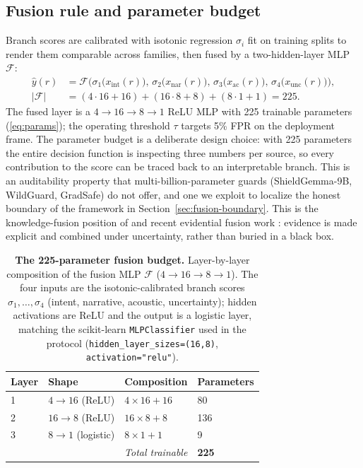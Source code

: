 \subsection{Fusion rule and parameter budget}
Branch scores are calibrated with isotonic regression $\sigma_i$ fit on
training splits to render them comparable across families, then fused by a
two-hidden-layer MLP $\mathcal{F}$:
\begin{align}
  \hat{y}(r) &=
    \mathcal{F}\!\Big(\sigma_1\big(x_{\mathrm{int}}(r)\big),\,
    \sigma_2\big(x_{\mathrm{nar}}(r)\big),\,
    \sigma_3\big(x_{\mathrm{ac}}(r)\big),\,
    \sigma_4\big(x_{\mathrm{unc}}(r)\big)\Big), \label{eq:fusion}\\
  |\mathcal{F}| &= (4\cdot 16 + 16) + (16\cdot 8 + 8) + (8\cdot 1 + 1) = 225. \label{eq:params}
\end{align}
The fused layer is a $4 \rightarrow 16 \rightarrow 8 \rightarrow 1$ ReLU MLP
with 225 trainable parameters (\eqref{eq:params}); the operating threshold
$\tau$ targets 5\% FPR on the deployment frame. The parameter budget is a
deliberate design choice: with 225 parameters the entire decision function is
inspecting three numbers per source, so every contribution to the score can be
traced back to an interpretable branch. This is an auditability property that
multi-billion-parameter guards (ShieldGemma-9B, WildGuard, GradSafe) do not
offer, and one we exploit to localize the honest boundary of the framework in
Section~\ref{sec:fusion-boundary}. This is the knowledge-fusion position of
\citet{shafer1976} and recent evidential fusion work
\citep{guo2024survey,shao2024duallevel,xu2025promethee}: evidence is made
explicit and combined under uncertainty, rather than buried in a black box.

\begin{table}[t]
\centering
\small
\caption{\textbf{The 225-parameter fusion budget.} Layer-by-layer composition
of the fusion MLP $\mathcal{F}$ ($4\to16\to8\to1$). The four inputs are the
isotonic-calibrated branch scores $\sigma_1,\dots,\sigma_4$ (intent, narrative,
acoustic, uncertainty); hidden activations are ReLU and the output is a
logistic layer, matching the scikit-learn \texttt{MLPClassifier} used in the
protocol (\texttt{hidden\_layer\_sizes=(16,8)}, \texttt{activation="relu"}).}
\label{tab:params}
\begin{tabular}{@{}llll@{}}
\toprule
Layer & Shape & Composition & Parameters \\
\midrule
1 & $4\to16$ (ReLU) & $4\times16+16$ & 80 \\
2 & $16\to8$ (ReLU) & $16\times8+8$ & 136 \\
3 & $8\to1$ (logistic) & $8\times1+1$ & 9 \\
\midrule
\multicolumn{3}{r}{\emph{Total trainable}} & \textbf{225} \\
\bottomrule
\end{tabular}
\end{table}

